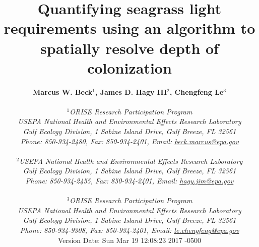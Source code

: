 \documentclass[letterpaper,12pt,oneside]{article}\usepackage[]{graphicx}\usepackage[]{color}
\begin{document}
\raggedbottom
\linenumbers
\raggedright
{}
\setlength{\parindent}{0.5in}
\renewcommand\refname{References \vspace{12pt}}

\begin{singlespace}
\title{{\bf {\Large Quantifying seagrass light requirements using an algorithm to spatially resolve depth of colonization}}}
\author{
  {\bf {\normalsize Marcus W. Beck$^1$, James D. Hagy III$^2$, Chengfeng Le$^3$}}
  \\\\{\textit {\normalsize $^1$ORISE Research Participation Program}}
  \\{\textit {\normalsize USEPA National Health and Environmental Effects Research Laboratory}}
  \\{\textit {\normalsize Gulf Ecology Division, 1 Sabine Island Drive, Gulf Breeze, FL 32561}}
	\\{\textit {\normalsize Phone: 850-934-2480, Fax: 850-934-2401, Email: \href{mailto:beck.marcus@epa.gov}{beck.marcus@epa.gov}}}
  \\\\{\textit {\normalsize $^2$USEPA National Health and Environmental Effects Research Laboratory}}
	\\{\textit {\normalsize Gulf Ecology Division, 1 Sabine Island Drive, Gulf Breeze, FL 32561}}
	\\{\textit {\normalsize Phone: 850-934-2455, Fax: 850-934-2401, Email: \href{mailto:hagy.jim@epa.gov}{hagy.jim@epa.gov}}}
  \\\\{\textit {\normalsize $^3$ORISE Research Participation Program}}
  \\{\textit {\normalsize USEPA National Health and Environmental Effects Research Laboratory}}
  \\{\textit {\normalsize Gulf Ecology Division, 1 Sabine Island Drive, Gulf Breeze, FL 32561}}
  \\{\textit {\normalsize Phone: 850-934-9308, Fax: 850-934-2401, Email: \href{mailto:le.chengfeng@epa.gov}{le.chengfeng@epa.gov}}}
  \vspace{1in} 
  \\ Version Date:   Sun Mar 19 12:08:23 2017 -0500
	}
\date{}
\maketitle
\end{singlespace}
\clearpage
\end{document}
